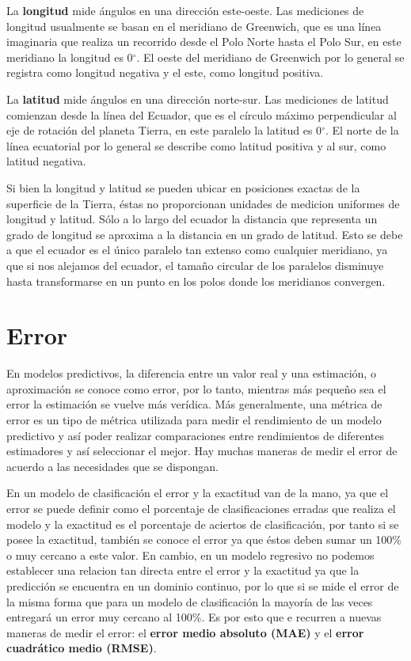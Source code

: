     La \textbf{longitud} mide ángulos en una dirección este-oeste. Las mediciones de longitud usualmente se basan en el meridiano de Greenwich, que es una línea
    imaginaria que realiza un recorrido desde el Polo Norte hasta el Polo Sur, en este meridiano la longitud es 0$^{\circ}$. El oeste del meridiano de Greenwich por lo general 
    se registra como longitud negativa y el este, como longitud positiva.

    La \textbf{latitud} mide ángulos en una dirección norte-sur. Las mediciones de latitud comienzan desde la línea del Ecuador, que es el círculo máximo perpendicular
    al eje de rotación del planeta Tierra, en este paralelo la latitud es 0$^{\circ}$. El norte de la línea ecuatorial por lo general 
    se describe como latitud positiva y al sur, como latitud negativa.

    Si bien la longitud y latitud se pueden ubicar en posiciones exactas de la superficie de la Tierra, éstas no proporcionan
    unidades de medicion uniformes de longitud y latitud. Sólo a lo largo del ecuador la distancia que representa un grado de longitud se aproxima a la distancia
    en un grado de latitud. Esto se debe a que el ecuador es el único paralelo tan extenso como cualquier meridiano, ya que si nos alejamos del ecuador, el tamaño circular de
    los paralelos disminuye hasta transformarse en un punto en los polos donde los meridianos convergen.
%    
%
%
%
\section{Error}
En modelos predictivos, la diferencia entre un valor real y una estimación, o aproximación se conoce como error, por lo tanto, mientras más pequeño sea el error
la estimación se vuelve más verídica. Más generalmente, una métrica de error es un tipo de métrica utilizada para medir el rendimiento de un modelo predictivo y así poder
realizar comparaciones entre rendimientos de diferentes estimadores y así seleccionar el mejor.
Hay muchas maneras de medir el error de acuerdo a las necesidades que se dispongan.


En un modelo de clasificación el error y la exactitud van de la mano, ya que el error se puede definir como el porcentaje de clasificaciones erradas que realiza el modelo 
y la exactitud es el porcentaje de aciertos de clasificación, por tanto si se posee la exactitud, también se conoce el error ya que éstos deben sumar un 100\% o muy cercano a este valor.
En cambio, en un modelo regresivo no podemos establecer una relacion tan directa entre el error y la exactitud ya que la predicción se encuentra en un dominio continuo, por lo que si se mide el 
error de la misma forma que para un modelo de clasificación la mayoría de las veces entregará un error muy cercano al 100\%. Es por esto que e recurren a nuevas maneras de medir el error: 
el \textbf{error medio absoluto (MAE)} y el \textbf{error cuadrático medio (RMSE)}.

